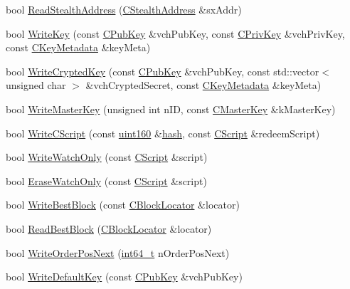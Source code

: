 \begin{DoxyCompactItemize}
\item 
bool \hyperlink{class_c_wallet_d_b_aebcc02069f91916c652d4e3e13be0f0b}{Read\+Stealth\+Address} (\hyperlink{class_c_stealth_address}{C\+Stealth\+Address} \&sx\+Addr)
\item 
bool \hyperlink{class_c_wallet_d_b_a7ebef5e0c7f604aa2159ba96d527e3a2}{Write\+Key} (const \hyperlink{class_c_pub_key}{C\+Pub\+Key} \&vch\+Pub\+Key, const \hyperlink{key_8h_a1da569b8b6e5b3fa1196cc1b877e7f54}{C\+Priv\+Key} \&vch\+Priv\+Key, const \hyperlink{class_c_key_metadata}{C\+Key\+Metadata} \&key\+Meta)
\item 
bool \hyperlink{class_c_wallet_d_b_a914fb53d1731daf9b486f164dd325210}{Write\+Crypted\+Key} (const \hyperlink{class_c_pub_key}{C\+Pub\+Key} \&vch\+Pub\+Key, const std\+::vector$<$ unsigned char $>$ \&vch\+Crypted\+Secret, const \hyperlink{class_c_key_metadata}{C\+Key\+Metadata} \&key\+Meta)
\item 
bool \hyperlink{class_c_wallet_d_b_a507690da431ef61244941ad39c308aeb}{Write\+Master\+Key} (unsigned int n\+I\+D, const \hyperlink{class_c_master_key}{C\+Master\+Key} \&k\+Master\+Key)
\item 
bool \hyperlink{class_c_wallet_d_b_a8c69e48e2305775898658e0a4f4616c9}{Write\+C\+Script} (const \hyperlink{classuint160}{uint160} \&\hyperlink{cache_8cc_a11ecb029164e055f28f4123ce3748862}{hash}, const \hyperlink{class_c_script}{C\+Script} \&redeem\+Script)
\item 
bool \hyperlink{class_c_wallet_d_b_a05e5a277f66010d12071a5d72cb4dfb0}{Write\+Watch\+Only} (const \hyperlink{class_c_script}{C\+Script} \&script)
\item 
bool \hyperlink{class_c_wallet_d_b_ad6e63f550853905fcd67ec9e7c3bef8b}{Erase\+Watch\+Only} (const \hyperlink{class_c_script}{C\+Script} \&script)
\item 
bool \hyperlink{class_c_wallet_d_b_a5660d366fee16ab81f3e7d3a97892486}{Write\+Best\+Block} (const \hyperlink{class_c_block_locator}{C\+Block\+Locator} \&locator)
\item 
bool \hyperlink{class_c_wallet_d_b_a20eecdac6605607ff7cba2f55ec86f73}{Read\+Best\+Block} (\hyperlink{class_c_block_locator}{C\+Block\+Locator} \&locator)
\item 
bool \hyperlink{class_c_wallet_d_b_a6a1f671e6376b38a1f73c8a023abdd38}{Write\+Order\+Pos\+Next} (\hyperlink{stdint_8h_adec1df1b8b51cb32b77e5b86fff46471}{int64\+\_\+t} n\+Order\+Pos\+Next)
\item 
bool \hyperlink{class_c_wallet_d_b_a1d925af18104900bddd19c968a0402b5}{Write\+Default\+Key} (const \hyperlink{class_c_pub_key}{C\+Pub\+Key} \&vch\+Pub\+Key)

\end{DoxyCompactItemize}
